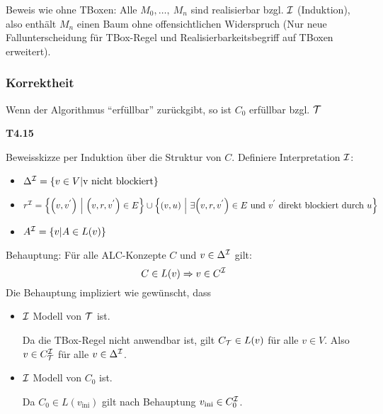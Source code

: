 Beweis wie ohne TBoxen: Alle $M_{0},\ldots,\ M_{n}$ sind realisierbar
bzgl. $\mathcal{I}$ (Induktion), also enthält $M_{n}$ einen Baum ohne
offensichtlichen Widerspruch (Nur neue Fallunterscheidung für TBox-Regel und Realisierbarkeitsbegriff auf TBoxen erweitert).

\subsubsection{Korrektheit}\label{korrektheit}

\begin{proposition}
    Wenn der Algorithmus \enquote{erfüllbar} zurückgibt, so ist $C_0$ erfüllbar bzgl. $\mathcal{T}$
\end{proposition}

\textbf{T4.15}

Beweisskizze per Induktion über die Struktur von $C$. Definiere
Interpretation $\mathcal{I}$:

\begin{itemize}
\item
  $\Delta^\MI = \left\{ v \in V \middle| \text{v\ }\mathrm{\text{nicht\ blockiert}} \right\}$
\item
  $r^\MI = \left\{ \left( v,v^{'} \right)\  \middle| \ \left( v,r,v^{'} \right) \in E \right\} \cup \left\{ \left( v,u \right)\  \middle| \ \exists\left( v,r,v^{'} \right) \in E\mathrm{\ }\mathrm{\text{und}}\mathrm{\ }v^{'}\mathrm{\ }\mathrm{\text{direkt\ blockiert\ durch}}\mathrm{\ }u \right\}$
\item
  $A^\MI = \left\{ v \middle| A \in L\left( v \right) \right\}$
\end{itemize}

Behauptung: Für alle ALC-Konzepte $C$ und $v \in \Delta^{\mathcal{I}}$ gilt:
$$C \in L\left( v \right) \Rightarrow v \in C^\MI$$
Die Behauptung impliziert wie gewünscht, dass

\begin{itemize}
\item
  $\mathcal{I}$ Modell von $\mathcal{T}$ ist.

Da die TBox-Regel nicht anwendbar ist, gilt $C_{\MT} \in L\left( v \right)$ für alle $v \in V$. Also $v \in C_{\mathcal{T}}^{\mathcal{I}}$ für alle $v \in \Delta^{\mathcal{I}}$.

\item
  $\mathcal{I}$ Modell von $C_{0}$ ist.

Da $C_{0} \in L\left( v_{\text{ini}} \right)$ gilt nach Behauptung
$v_{\text{ini}} \in C_{0}^{\mathcal{I}}$.
\end{itemize}

